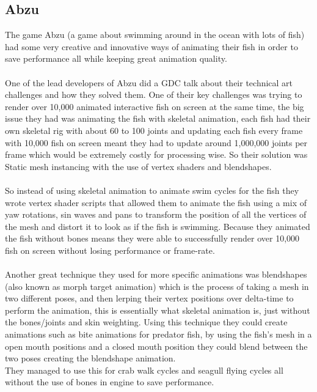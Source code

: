\documentclass{scrartcl}
\begin{document}
\subsection{Abzu}
The game Abzu (a game about swimming around in the ocean with lots of fish) had some very creative and innovative ways of animating their fish in order to save performance all while keeping great animation quality.
\\~\\
One of the lead developers of Abzu did a GDC talk about their technical art challenges and how they solved them.\cite{seven} One of their key challenges was trying to render over 10,000 animated interactive fish on screen at the same time, the big issue they had was animating the fish with skeletal animation, each fish had their own skeletal rig with about 60 to 100 joints and updating each fish every frame with 10,000 fish on screen meant they had to update around 1,000,000 joints per frame which would be extremely costly for processing wise. So their solution was Static mesh instancing with the use of vertex shaders and blendshapes.
\\~\\
So instead of using skeletal animation to animate swim cycles for the fish they wrote vertex shader scripts that allowed them to animate the fish using a mix of yaw rotations, sin waves and pans to transform the position of all the vertices of the mesh and distort it to look as if the fish is swimming. Because they animated the fish without bones means they were able to successfully render over 10,000 fish on screen without losing performance or frame-rate.
\\~\\
Another great technique they used for more specific animations was blendshapes (also known as morph target animation) which is the process of taking a mesh in two different poses, and then lerping their vertex positions over delta-time to perform the animation, this is essentially what skeletal animation is, just without the bones/joints and skin weighting. Using this technique they could create animations such as bite animations for predator fish, by using the fish's mesh in a open mouth positions and a closed mouth position they could blend between the two poses creating the blendshape animation.\\
They managed to use this for crab walk cycles and seagull flying cycles all without the use of bones in engine to save performance.

\end{document}
